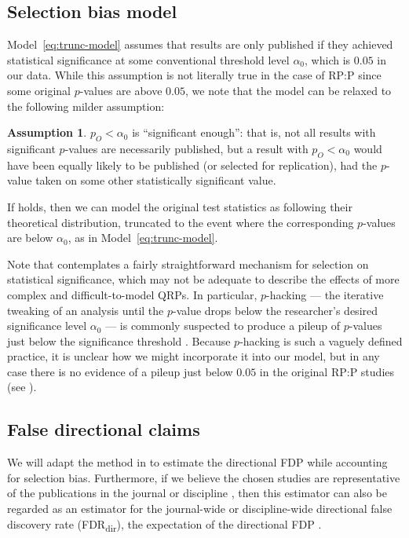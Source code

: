 \documentclass[11pt]{article}
\theoremstyle{definition}
\newtheorem{assumption}{Assumption}
\theoremstyle{custom}
\newcommand{\ao}{\alpha_0}
\begin{document}
\subsection{Selection bias model}
  Model~\eqref{eq:trunc-model} assumes that results are only published if they achieved statistical significance at some conventional threshold level $\ao$, which is $0.05$ in our data. While this assumption is not literally true in the case of RP:P since some original $p$-values are above $0.05$, we note that the model can be relaxed to the following milder assumption:
  \begin{assumption}
    \label{ass:sig-enough}
    $p_O < \ao$ is ``significant enough'': that is, not all results with significant $p$-values are necessarily published, but a result with $p_O < \ao$ would have been equally likely to be published (or selected for replication), had the $p$-value taken on some other statistically significant value.
  \end{assumption}

  If  holds, then we can model the original test statistics as following their theoretical distribution, truncated to the event where the corresponding $p$-values are below $\ao$, as in Model~\ref{eq:trunc-model}.

  Note that  contemplates a fairly straightforward mechanism for selection on statistical significance, which may not be adequate to describe the effects of more complex and difficult-to-model QRPs. In particular, $p$-hacking --- the iterative tweaking of an analysis until the $p$-value drops below the researcher's desired significance level $\ao$ --- is commonly suspected to produce a pileup of $p$-values just below the significance threshold \citep[see e.g.][]{Simonsohn:2014fa}. Because $p$-hacking is such a vaguely defined practice, it is unclear how we might incorporate it into our model, but in any case there is no evidence of a pileup just below $0.05$ in the original RP:P studies (see ).

\subsection{False directional claims}

  We will adapt the method in \citet{Storey:2002vj} to estimate the directional FDP while accounting for selection bias. Furthermore, if we believe the chosen studies are representative of the publications in the journal or discipline \citep[e.g.][]{Stroebe:2016dj}, then this estimator can also be regarded as an estimator for the journal-wide or discipline-wide directional false discovery rate (FDR\textsubscript{dir}), the expectation of the directional FDP \citep{Benjamini:2005bv}.
\end{document}

